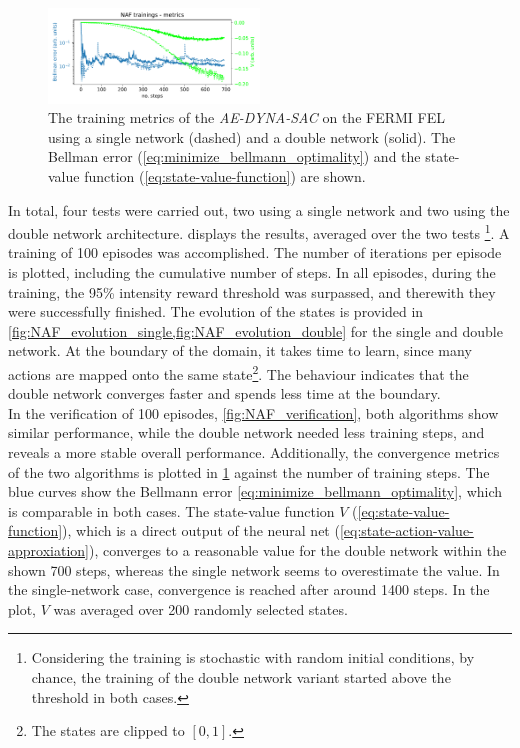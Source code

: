 \documentclass[
reprint,
amsmath,amssymb,amsfonts,clevref,
aps,
prstab,
]{revtex4-2}
\begin{document}
	\begin{figure}
		\centering
		\includegraphics*[width=0.5\textwidth]{Figures/FERMI_all_experiments_NAF_convergence.pdf}
		\caption{The training metrics of the \emph{AE-DYNA-SAC} on the FERMI FEL using a single network (dashed) and a double network (solid). The Bellman error (\cref{eq:minimize_bellmann_optimality}) and the state-value function (\cref{eq:state-value-function}) are shown. }
		\label{fig:NAF_convergence}
	\end{figure}
	In total, four tests were carried out, two using a single network and two using the double network architecture. 
	 displays the results, averaged over the two tests \footnote{Considering the training is stochastic with random initial conditions, by chance, the training of the double network variant started above the threshold in both cases.}. A training of 100 episodes was accomplished. The number of iterations per episode is plotted, including the cumulative number of steps. In all episodes, during the training, the 95\% intensity reward threshold was surpassed, and therewith they were successfully finished. The evolution of the states is provided in \cref{fig:NAF_evolution_single,fig:NAF_evolution_double} for the single and double network. At the boundary of the domain, it takes time to learn, since many actions are mapped onto the same state\footnote{The states are clipped to $[0,1]$.}. The behaviour indicates that the double network converges faster and spends less time at the boundary.\\
	In the verification of 100 episodes, \cref{fig:NAF_verification}, both algorithms show similar performance, while the double network needed less training steps, and reveals a more stable overall performance. Additionally, the convergence metrics of the two algorithms is plotted in \cref{fig:NAF_convergence} against the number of training steps. The blue curves show the Bellmann error \cref{eq:minimize_bellmann_optimality}, which is comparable in both cases. The state-value function $V$ (\cref{eq:state-value-function}), which is a direct output of the neural net (\cref{eq:state-action-value-approxiation}), converges to a reasonable value for the double network within the shown 700 steps, whereas the single network seems to overestimate the value. In the single-network case, convergence is reached after around 1400 steps. In the plot, $V$ was averaged over 200 randomly selected states.
\end{document}
